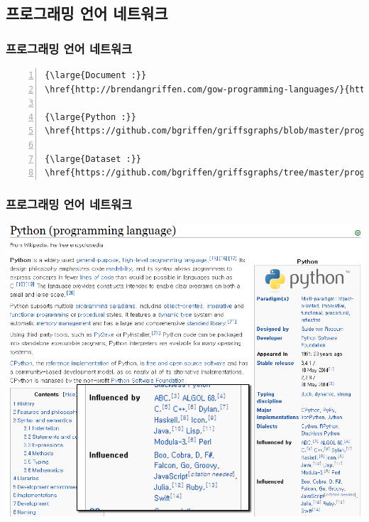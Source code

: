 \documentclass{beamer}
\newcommand{\fbckg}[1]{\usebackgroundtemplate{\texttt{[image: \#1]}}}%
\begin{document}
\subsection{프로그래밍 언어 네트워크}

{
\fbckg{language_degree.png}
\begin{frame}[fragile]
\frametitle{프로그래밍 언어 네트워크}
\tiny
\begin{Verbatim}[numbers=left,commandchars=\\\{\}]
{\large{Document :}}
\href{http://brendangriffen.com/gow-programming-languages/}{http://brendangriffen.com/gow-programming-languages/}

{\large{Python :}}
\href{https://github.com/bgriffen/griffsgraphs/blob/master/programminglanguages/proglanguages.py}{https://github.com/bgriffen/griffsgraphs/blob/master/programminglanguages/proglanguages.py}

{\large{Dataset :}} 
\href{https://github.com/bgriffen/griffsgraphs/tree/master/programminglanguages/data/languages}{https://github.com/bgriffen/griffsgraphs/tree/master/programminglanguages/data/languages}
\end{Verbatim}
\end{frame}
}

\begin{frame}
\frametitle{프로그래밍 언어 네트워크}
\begin{center}
\includegraphics[scale=0.45]{python.png}
\end{center}
\end{frame}
\end{document}

